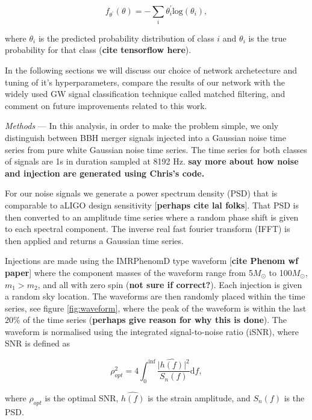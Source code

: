\documentclass[%
 amsmath,amssymb,
 aps,
 twocolumn,
floatfix,
]{revtex4-1}
\begin{document}
\begin{equation} \label{eq:loss}
f_{\theta^{'}}(\theta) = -\sum_{i} \theta_{i}^{'} \mathrm{log}(\theta_{i}),
\end{equation}

where $\theta_{i}$ is the predicted probability distribution of class $i$ and $\theta_{i}$ is the true probability for that class (\textbf{cite tensorflow here}). 

In the following sections we will discuss our choice of network archetecture and tuning of it's hyperparameters, compare the results of our network with the widely used GW signal classification technique called matched filtering, and comment on future improvements related to this work.      

\textit{Methods} --- In this analysis, in order to make the problem simple, we only distinguish between BBH merger signals injected into a Gaussian noise time series from pure white Gaussian noise time series. The time series for both classes of signals are 1s in duration sampled at 8192 Hz. \textbf{say more about how noise and injection are generated using Chris's code.} 

For our noise signals we generate a power spectrum density (PSD) that is comparable to aLIGO design sensitivity [\textbf{perhaps cite lal folks}]. That PSD is then converted to an amplitude time series where a random phase shift is given to each spectral component. The inverse real fast fourier transform (IFFT) is then applied and returns a Gaussian time series.

Injections are made using the IMRPhenomD type waveform [\textbf{cite Phenom wf paper}] where the component masses of the waveform range from 5\(M_\odot\) to 100\(M_\odot\), $m_{1} > m_{2}$, and all with zero spin (\textbf{not sure if correct?}). Each injection is given a random sky location. The waveforms are then randomly placed within the time series, see figure \ref{fig:waveform}, where the peak of the waveform is within the last $20$\% of the time series (\textbf{perhaps give reason for why this is done}). The waveform is normalised using the integrated signal-to-noise ratio (iSNR), where SNR is defined as

\begin{equation} \label{eq:snr}
\rho_{opt}^{2} = 4 \int_{0}^{\inf} \frac{\lvert \hat{h(f)}\rvert^{2}}{S_{n}(f)} \mathrm{d}f,
\end{equation}

where $\rho_{opt}$ is the optimal SNR, $\hat{h(f)}$ is the strain amplitude, and $S_{n}(f)$ is the PSD.
\end{document}
